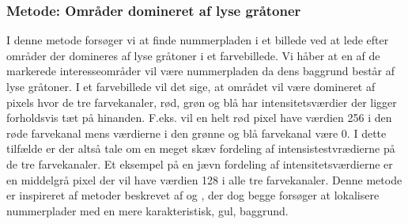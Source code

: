 \subsubsection{Metode: Områder domineret af lyse gråtoner}
\label{sec:DetectSameness}
I denne metode forsøger vi at finde nummerpladen i et billede ved at lede efter områder der domineres af lyse gråtoner i et farvebillede. Vi håber at en af de markerede interesseområder vil være nummerpladen da dens baggrund består af lyse gråtoner. I et farvebillede vil det sige, at området vil være domineret af pixels hvor de tre farvekanaler, rød, grøn og blå har intensitetsværdier der ligger forholdsvis tæt på hinanden. F.eks. vil en helt rød pixel have værdien 256 i den røde farvekanal mens værdierne i den grønne og blå farvekanal være 0. I dette tilfælde er der altså tale om en meget skæv fordeling af intensistestvrædierne på de tre farvekanaler. Et eksempel på en jævn fordeling af intensitetsværdierne er en middelgrå pixel der vil have værdien 128 i alle tre farvekanaler. Denne metode er inspireret af metoder beskrevet af \cite{ron} og \cite{nijhuis}, der dog begge forsøger at lokalisere nummerplader med en mere karakteristisk, gul, baggrund.


